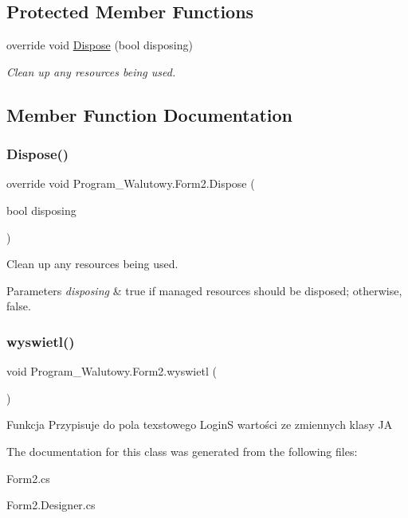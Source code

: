 \subsection*{Protected Member Functions}
\begin{DoxyCompactItemize}
\item 
override void \mbox{\hyperlink{class_program___walutowy_1_1_form2_a588c0e8c55d1b89ba73e34d43256d901}{Dispose}} (bool disposing)
\begin{DoxyCompactList}\small\item\em Clean up any resources being used. \end{DoxyCompactList}\end{DoxyCompactItemize}


\subsection{Member Function Documentation}
\mbox{\label{class_program___walutowy_1_1_form2_a588c0e8c55d1b89ba73e34d43256d901}} 
\subsubsection{\texorpdfstring{Dispose()}{Dispose()}}
{\footnotesize\ttfamily override void Program\+\_\+\+Walutowy.\+Form2.\+Dispose (\begin{DoxyParamCaption}\item[{bool}]{disposing }\end{DoxyParamCaption})\hspace{0.3cm}{\ttfamily [protected]}}



Clean up any resources being used. 


\begin{DoxyParams}{Parameters}
{\em disposing} & true if managed resources should be disposed; otherwise, false.\\
\hline
\end{DoxyParams}
\mbox{\label{class_program___walutowy_1_1_form2_a1c6069b5128d5cc8b2c26180bfee99e3}} 
\subsubsection{\texorpdfstring{wyswietl()}{wyswietl()}}
{\footnotesize\ttfamily void Program\+\_\+\+Walutowy.\+Form2.\+wyswietl (\begin{DoxyParamCaption}{ }\end{DoxyParamCaption})}

Funkcja Przypisuje do pola texstowego LoginS wartości ze zmiennych klasy JA 

The documentation for this class was generated from the following files\+:\begin{DoxyCompactItemize}
\item 
Form2.\+cs\item 
Form2.\+Designer.\+cs\end{DoxyCompactItemize}
